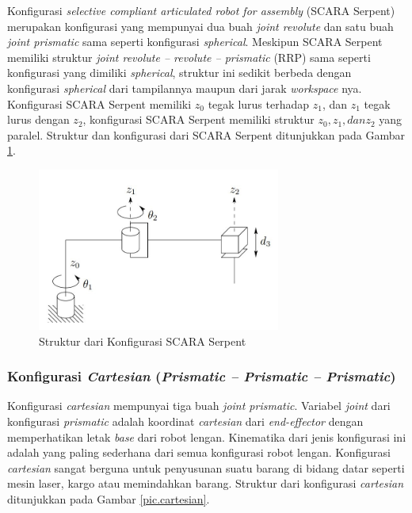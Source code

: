 Konfigurasi \textit{selective compliant articulated robot for assembly} (SCARA Serpent) merupakan konfigurasi yang mempunyai dua buah \textit{joint revolute} dan satu buah \textit{joint prismatic} sama seperti konfigurasi \textit{spherical}. Meskipun SCARA Serpent memiliki struktur \textit{joint revolute – revolute – prismatic} (RRP) sama seperti konfigurasi yang dimiliki \textit{spherical}, struktur ini sedikit berbeda dengan konfigurasi \textit{spherical} dari tampilannya maupun dari jarak \textit{workspace} nya. Konfigurasi SCARA Serpent memiliki $z_{0}$ tegak lurus terhadap $z_{1}$, dan $z_{1}$ tegak lurus dengan $z_{2}$, konfigurasi SCARA Serpent memiliki struktur $z_{0}, z_{1}, dan z_{2}$ yang paralel. Struktur dan konfigurasi dari SCARA Serpent ditunjukkan pada Gambar \ref{pic.SCARA212112122}.
\begin{figure}[H]
	\centering

	\includegraphics[width=8cm]{gambar/SCARA.jpg}
	\caption{Struktur dari Konfigurasi SCARA Serpent\cite{Spong2006}}
		\label{pic.SCARA212112122}
\end{figure}


\subsubsection{Konfigurasi \textit{Cartesian} (\textit{Prismatic – Prismatic – Prismatic})  } 

Konfigurasi \textit{cartesian} mempunyai tiga buah \textit{joint prismatic}. Variabel \textit{joint} dari konfigurasi \textit{prismatic} adalah koordinat \textit{cartesian} dari \textit{end-effector} dengan memperhatikan letak \textit{base} dari robot lengan. Kinematika dari jenis konfigurasi ini adalah yang paling sederhana dari semua konfigurasi robot lengan. Konfigurasi \textit{cartesian} sangat berguna untuk penyusunan suatu barang di bidang datar seperti mesin laser, kargo atau memindahkan barang. Struktur dari konfigurasi \textit{cartesian} ditunjukkan pada Gambar \ref{pic.cartesian}.

